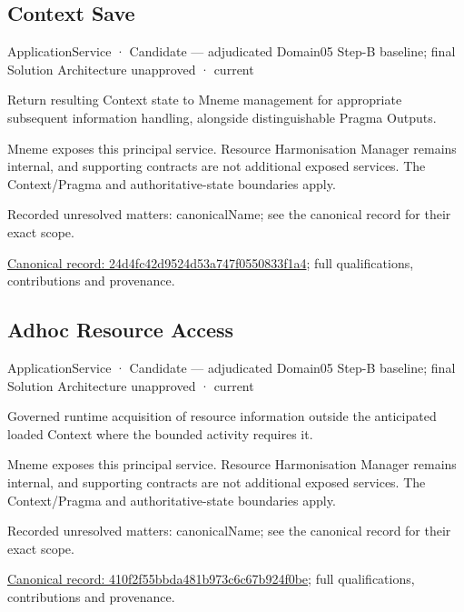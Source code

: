 \subsection{Context Save}

\label{element:24d4fc42d9524d53a747f0550833f1a4}
{\small ApplicationService · Candidate — adjudicated Domain05 Step-B baseline; final Solution Architecture unapproved · current}\par

Return resulting Context state to Mneme management for appropriate subsequent information handling, alongside distinguishable Pragma Outputs.



Mneme exposes this principal service. Resource Harmonisation Manager remains internal, and supporting contracts are not additional exposed services. The Context/Pragma and authoritative-state boundaries apply.


{\small Recorded unresolved matters: canonicalName; see the canonical record for their exact scope.}\par
{\footnotesize \href{../../../../continuum/application/application-service/24d4fc42d9524d53a747f0550833f1a4.md}{Canonical record: 24d4fc42d9524d53a747f0550833f1a4}; full qualifications, contributions and provenance.}\par
\subsection{Adhoc Resource Access}

\label{element:410f2f55bbda481b973c6c67b924f0be}
{\small ApplicationService · Candidate — adjudicated Domain05 Step-B baseline; final Solution Architecture unapproved · current}\par

Governed runtime acquisition of resource information outside the anticipated loaded Context where the bounded activity requires it.



Mneme exposes this principal service. Resource Harmonisation Manager remains internal, and supporting contracts are not additional exposed services. The Context/Pragma and authoritative-state boundaries apply.


{\small Recorded unresolved matters: canonicalName; see the canonical record for their exact scope.}\par
{\footnotesize \href{../../../../continuum/application/application-service/410f2f55bbda481b973c6c67b924f0be.md}{Canonical record: 410f2f55bbda481b973c6c67b924f0be}; full qualifications, contributions and provenance.}\par
